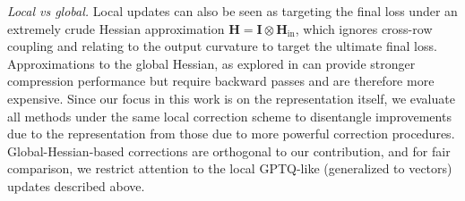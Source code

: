 \documentclass{article}
\theoremstyle{plain}
\theoremstyle{definition}
\theoremstyle{remark}
\begin{document}
% 

\emph{Local vs global.} Local updates can also be seen as targeting the final loss under an extremely crude Hessian approximation $\mathbf{H} = \mathbf{I}\otimes\mathbf{H}_{\text{in}}$, which ignores cross-row coupling and relating to the output curvature to target the ultimate final loss. Approximations to the global Hessian, as explored in \citep{van2023llm,tseng2025model} can provide stronger compression performance but require backward passes and are therefore more expensive. Since our focus in this work is on the representation itself, we evaluate all methods under the same local correction scheme to disentangle improvements due to the representation from those due to more powerful correction procedures. Global-Hessian-based corrections are orthogonal to our contribution, and for fair comparison, we restrict attention to the local GPTQ-like (generalized to vectors) updates described above.
\end{document}
